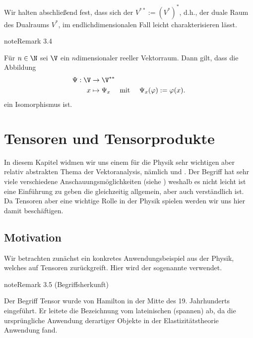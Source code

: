 \documentclass[letterpaper,10pt,german]{jupyterBook}
\begin{document}
\sphinxAtStartPar
Wir halten abschließend fest, dass sich der  \(V^{\ast\ast} := (V^\ast)^\ast\), d.h., der duale Raum des Dualraums \(V^\ast\), im endlich\sphinxhyphen{}dimensionalen Fall leicht charakterisieren lässt.
\label{vektoranalysis/multilinear:rem:doubledual}
\begin{sphinxadmonition}{note}{Remark 3.4}



\sphinxAtStartPar
Für \(n \in \N\) sei \(\V\) ein \(n\)\sphinxhyphen{}dimensionaler reeller Vektorraum.
Dann gilt, dass die Abbildung
\begin{equation*}
\begin{split}\Psi :\V &\rightarrow \V^{\ast\ast}\\
x &\mapsto \Psi_x \quad \text{ mit } \quad \Psi_x(\varphi) := \varphi(x).\end{split}
\end{equation*}
\sphinxAtStartPar
ein Isomorphismus ist.
\end{sphinxadmonition}


\section{Tensoren und Tensorprodukte}
\label{\detokenize{vektoranalysis/tensor:tensoren-und-tensorprodukte}}\label{\detokenize{vektoranalysis/tensor:s-tensoren}}\label{\detokenize{vektoranalysis/tensor::doc}}
\sphinxAtStartPar
In diesem Kapitel widmen wir uns einem für die Physik sehr wichtigen aber relativ abstrakten Thema der Vektoranalysis, nämlich  und .
Der Begriff hat sehr viele verschiedene Anschauungsmöglichkeiten (siehe ) weshalb es nicht leicht ist eine Einführung zu geben die gleichzeitig allgemein, aber auch verständlich ist. Da Tensoren aber eine wichtige Rolle in der Physik spielen werden wir uns hier damit beschäftigen.


\subsection{Motivation}
\label{\detokenize{vektoranalysis/tensor:motivation}}
\sphinxAtStartPar
Wir betrachten zunächst ein konkretes Anwendungsbeispiel aus der Physik, welches auf Tensoren zurückgreift.
Hier wird der sogenannte  verwendet.
\label{vektoranalysis/tensor:remark-0}
\begin{sphinxadmonition}{note}{Remark 3.5 (Begriffsherkunft)}



\sphinxAtStartPar
Der Begriff Tensor wurde von Hamilton in der Mitte des 19. Jahrhunderts eingeführt. Er leitete die Bezeichnung vom lateinischen  (spannen) ab, da die ursprüngliche Anwendung derartiger Objekte in der Elastizitätstheorie Anwendung fand.
\end{sphinxadmonition}
\end{document}
